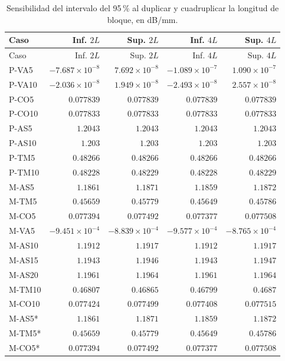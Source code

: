 \begingroup\small\setlength{\tabcolsep}{4pt}
\begin{longtable}{lrrrr}
\caption{Sensibilidad del intervalo del 95\,\% al duplicar y cuadruplicar la longitud de bloque, en dB/mm.}\label{t:ic}\\
\hline Caso & Inf. $2L$ & Sup. $2L$ & Inf. $4L$ & Sup. $4L$ \\ \hline\endfirsthead
\hline Caso & Inf. $2L$ & Sup. $2L$ & Inf. $4L$ & Sup. $4L$ \\ \hline\endhead
P-VA5 & $-7.687\times 10^{-8}$ & $7.692\times 10^{-8}$ & $-1.089\times 10^{-7}$ & $1.090\times 10^{-7}$ \\
P-VA10 & $-2.036\times 10^{-8}$ & $1.949\times 10^{-8}$ & $-2.493\times 10^{-8}$ & $2.557\times 10^{-8}$ \\
P-CO5 & $0.077839$ & $0.077839$ & $0.077839$ & $0.077839$ \\
P-CO10 & $0.077833$ & $0.077833$ & $0.077833$ & $0.077833$ \\
P-AS5 & $1.2043$ & $1.2043$ & $1.2043$ & $1.2043$ \\
P-AS10 & $1.203$ & $1.203$ & $1.203$ & $1.203$ \\
P-TM5 & $0.48266$ & $0.48266$ & $0.48266$ & $0.48266$ \\
P-TM10 & $0.48228$ & $0.48229$ & $0.48228$ & $0.48229$ \\
M-AS5 & $1.1861$ & $1.1871$ & $1.1859$ & $1.1872$ \\
M-TM5 & $0.45659$ & $0.45779$ & $0.45649$ & $0.45786$ \\
M-CO5 & $0.077394$ & $0.077492$ & $0.077377$ & $0.077508$ \\
M-VA5 & $-9.451\times 10^{-4}$ & $-8.839\times 10^{-4}$ & $-9.577\times 10^{-4}$ & $-8.765\times 10^{-4}$ \\
M-AS10 & $1.1912$ & $1.1917$ & $1.1912$ & $1.1917$ \\
M-AS15 & $1.1943$ & $1.1946$ & $1.1943$ & $1.1947$ \\
M-AS20 & $1.1961$ & $1.1964$ & $1.1961$ & $1.1964$ \\
M-TM10 & $0.46807$ & $0.46865$ & $0.46799$ & $0.4687$ \\
M-CO10 & $0.077424$ & $0.077499$ & $0.077408$ & $0.077515$ \\
M-AS5* & $1.1861$ & $1.1871$ & $1.1859$ & $1.1872$ \\
M-TM5* & $0.45659$ & $0.45779$ & $0.45649$ & $0.45786$ \\
M-CO5* & $0.077394$ & $0.077492$ & $0.077377$ & $0.077508$ \\
\hline\end{longtable}\endgroup
